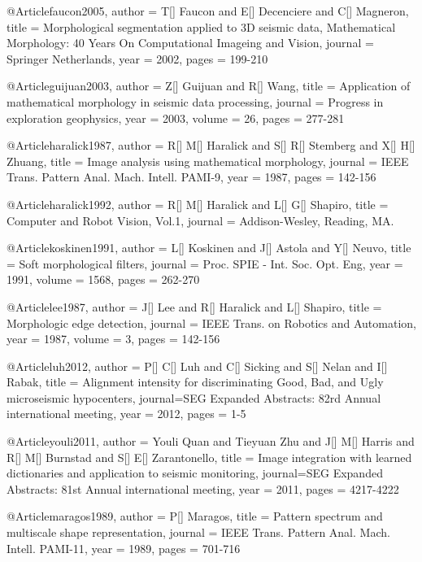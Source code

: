 @Article{faucon2005,
  author = 	 {T[] Faucon and E[] Decenciere and C[] Magneron},
  title = 	 {Morphological segmentation applied to 3{D} seismic data, Mathematical Morphology: 40 Years On Computational Imageing and Vision},
  journal = 	 {Springer Netherlands},
  year = 	 2002,
  pages = 	 {199-210}}      
  
    @Article{guijuan2003,
  author = 	 {Z[] Guijuan and R[] Wang},
  title = 	 {Application of mathematical morphology in seismic data processing},
  journal = 	 {Progress in exploration geophysics},
  year = 	 2003,
  volume = 	 26,
  pages = 	 {277-281}}     
   
@Article{haralick1987,
  author = 	 {R[] M[] Haralick and S[] R[] Stemberg and X[] H[] Zhuang},
  title = 	 {Image analysis using mathematical morphology},
  journal = 	 {IEEE Trans. Pattern Anal. Mach. Intell. PAMI-9},
  year = 	 1987,
  pages = 	 {142-156}}    
  
@Article{haralick1992,
  author = 	 {R[] M[] Haralick and L[] G[] Shapiro},
  title = 	 {Computer and Robot Vision, Vol.1},
  journal = 	 {Addison-Wesley, Reading,
MA.}}   
  
   @Article{koskinen1991,
  author = 	 {L[] Koskinen and J[] Astola and Y[] Neuvo},
  title = 	 {Soft morphological filters},
  journal = 	 {Proc. SPIE - Int. Soc. Opt. Eng},
  year = 	 1991,
    volume = 	 1568,
  pages = 	 {262-270}}     
  
     @Article{lee1987,
  author = 	 {J[] Lee and R[] Haralick and L[] Shapiro},
  title = 	 {Morphologic edge detection},
  journal = 	 {IEEE Trans. on Robotics and
Automation},
  year = 	 1987,
  volume = 	 3,
  pages = 	 {142-156}}   

     @Article{luh2012,
  author = 	 {P[] C[] Luh and C[] Sicking and S[] Nelan and I[] Rabak},
  title = 	 {Alignment intensity for discriminating Good, Bad, and Ugly microseismic hypocenters},
  journal={SEG Expanded Abstracts: 82rd Annual international meeting},
  year = 	 2012,
  pages = 	 {1-5}}  

     @Article{youli2011,
  author = 	 {Youli Quan and Tieyuan Zhu and J[] M[] Harris and R[] M[] Burnstad and S[] E[] Zarantonello},
  title = 	 {Image integration with learned dictionaries and application to seismic monitoring},
  journal={SEG Expanded Abstracts: 81st Annual international meeting},
  year = 	 2011,
  pages = 	 {4217-4222}} 
    
     @Article{maragos1989,
  author = 	 {P[] Maragos},
  title = 	 {Pattern spectrum and multiscale shape representation},
  journal = 	 {IEEE Trans. Pattern Anal.
Mach. Intell. PAMI-11},
  year = 	 1989,
  pages = 	 {701-716}}     
  

